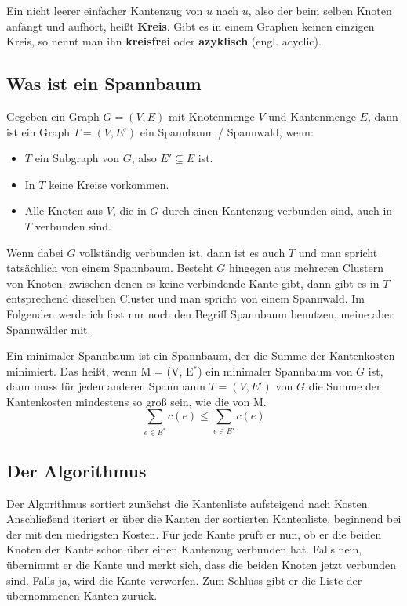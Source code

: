 Ein nicht leerer einfacher Kantenzug von $u$ nach $u$, also der beim selben Knoten anfängt und aufhört, heißt \textbf{Kreis}.
Gibt es in einem Graphen keinen einzigen Kreis, so nennt man ihn \textbf{kreisfrei} oder \textbf{azyklisch} (engl. acyclic).

\subsection{Was ist ein Spannbaum}
Gegeben ein Graph $G = (V, E)$ mit Knotenmenge $V$ und Kantenmenge $E$, dann ist ein Graph $T = (V, E')$ ein Spannbaum / Spannwald, wenn: 
\begin{itemize}
  \item $T$ ein Subgraph von $G$, also $E' \subseteq E$ ist.
  \item In $T$ keine Kreise vorkommen.
  \item Alle Knoten aus $V$, die in $G$ durch einen Kantenzug verbunden sind, auch in $T$ verbunden sind.
\end{itemize}
Wenn dabei $G$ vollständig verbunden ist, dann ist es auch $T$ und man spricht tatsächlich von einem Spannbaum. 
Besteht $G$ hingegen aus mehreren Clustern von Knoten, zwischen denen es keine verbindende Kante gibt, dann gibt es in $T$ entsprechend dieselben Cluster und  man  spricht von einem Spannwald.
Im Folgenden werde ich fast nur noch den Begriff Spannbaum benutzen, meine aber Spannwälder mit.

Ein minimaler Spannbaum ist ein Spannbaum, der die Summe der Kantenkosten minimiert. Das heißt, wenn M = (V, E$^\ast$) ein minimaler Spannbaum von $G$ ist, 
dann muss für jeden anderen Spannbaum $T = (V, E')$ von $G$ die Summe der Kantenkosten mindestens so groß sein, wie die von M.
$$\sum_{e \in E^\ast} c(e) \le \sum_{e \in E'} c(e)$$

\subsection{Der Algorithmus}
Der Algorithmus sortiert zunächst die Kantenliste aufsteigend nach Kosten.
Anschließend iteriert er über die Kanten der sortierten Kantenliste, beginnend bei der mit den niedrigsten Kosten.
Für jede Kante prüft er nun, ob er die beiden Knoten der Kante schon über einen Kantenzug verbunden hat.
Falls nein, übernimmt er die Kante und merkt sich, dass die beiden Knoten jetzt verbunden sind.
Falls ja, wird die Kante verworfen.
Zum Schluss gibt er die Liste der übernommenen Kanten zurück.

